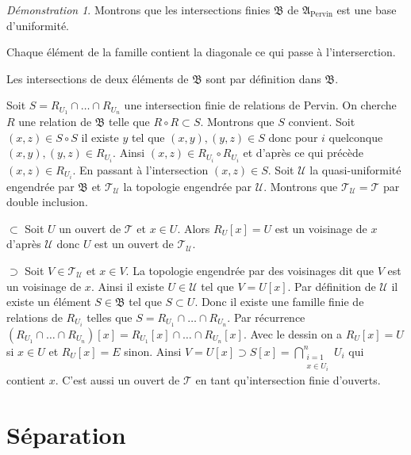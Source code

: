 \documentclass[a4paper, 11pt, french]{book}
\newenvironment{itemise}{\itemize}{\enditemize}
\theoremstyle{plain} %
\theoremstyle{definition} %
\theoremstyle{remark} %
\newtheorem*{demonstration}{Démonstration}
\newcommand{\1}{\mathds{1}}
\renewcommand{\frak}[1]{\mathfrak{#1}}
\newcommand{\scr}[1]{\mathscr{#1}}
\begin{document}
\begin{demonstration}
	Montrons que les intersections finies $\frak{B}$ de $\frak{A}_\text{Pervin}$ est une base d'uniformité.
	\begin{itemise}
		\item Chaque élément de la famille contient la diagonale ce qui passe à l'interserction.
		\item Les intersections de deux éléments de $\frak{B}$ sont par définition dans $\frak{B}$.
		\item Soit $S=R_{U_1}\cap\dots\cap R_{U_n}$ une intersection finie de relations de Pervin.
		On cherche $R$ une relation de $\frak{B}$ telle que $R\circ R\subset S$.
		Montrons que $S$ convient.
		Soit $(x, z)\in S\circ S$ il existe $y$ tel que $(x, y), (y, z)\in S$ donc pour $i$ quelconque $(x, y), (y, z)\in R_{U_i}$.
		Ainsi $(x, z)\in R_{U_i}\circ R_{U_i}$ et d'après ce qui précède $(x, z)\in R_{U_i}$.
		En passant à l'intersection $(x, z)\in S$.
	\end{itemise}
	Soit $\scr{U}$ la quasi-uniformité engendrée par $\frak{B}$ et $\scr{T}_\scr{U}$ la topologie engendrée par $\scr{U}$.
	Montrons que $\scr{T}_\scr{U}=\scr{T}$ par double inclusion.
	\begin{itemise}
		\item[$\subset$] Soit $U$ un ouvert de $\scr{T}$ et $x\in U$.
		Alors $R_U[x]=U$ est un voisinage de $x$ d'après $\scr{U}$ donc $U$ est un ouvert de $\scr{T}_\scr{U}$.
		\item[$\supset$] Soit $V\in\scr{T}_\scr{U}$ et $x\in V$.
		La topologie engendrée par des voisinages dit que $V$ est un voisinage de $x$.
		Ainsi il existe $U\in\scr{U}$ tel que $V=U[x]$.
		Par définition de $\scr{U}$ il existe un élément $S\in\frak{B}$ tel que $S\subset U$.
		Donc il existe une famille finie de relations de $R_{U_i}$ telles que $S=R_{U_1}\cap\dots\cap R_{U_n}$.
		Par récurrence $(R_{U_1}\cap\dots\cap R_{U_n})[x]=R_{U_1}[x]\cap\dots\cap R_{U_n}[x]$.
		Avec le dessin on a $R_U[x]=U$ si $x\in U$ et $R_U[x]=E$ sinon.
		Ainsi $V=U[x]\supset S[x]=\bigcap_{\substack{i=1 \\ x\in U_i}}^nU_i$ qui contient $x$.
		C'est aussi un ouvert de $\scr{T}$ en tant qu'intersection finie d'ouverts.
	\end{itemise}
\end{demonstration}

\section{Séparation}
\end{document}
